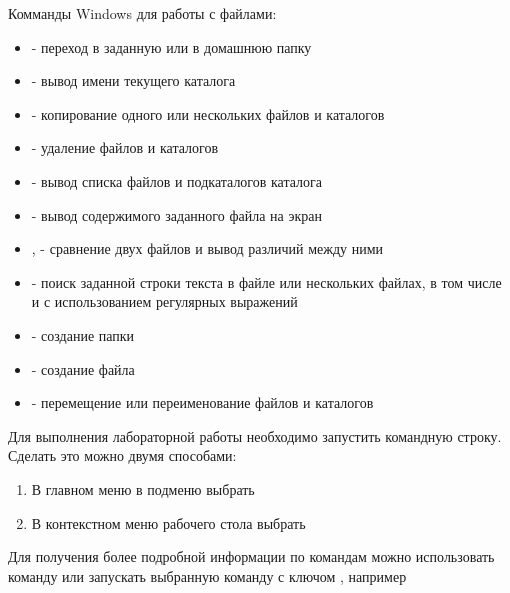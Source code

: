 \documentclass[a4paper,12pt]{article}
\begin{document}
  
    \begin{flushleft}
        Комманды Windows для работы с файлами:
        \begin{itemize}
            \item {} - переход в заданную или в домашнюю папку
            \item {} - вывод имени текущего каталога
            \item {} - копирование одного или нескольких файлов и каталогов
            \item {} - удаление файлов и каталогов
            \item {} - вывод списка файлов и подкаталогов каталога
            \item {} - вывод содержимого заданного файла на экран
            \item {},  - сравнение двух файлов и вывод различий между ними
            \item {} - поиск заданной строки текста в файле или нескольких файлах, в том числе и с использованием регулярных выражений
            \item {} - создание папки
            \item {} - создание файла
            \item {} - перемещение или переименование файлов и каталогов
        \end{itemize}
    \end{flushleft}
  
    \begin{flushleft}
        Для выполнения лабораторной работы необходимо запустить командную строку. Сделать это можно двумя способами:
        \begin{enumerate}
            \item В главном меню в подменю  выбрать 
            \item В контекстном меню рабочего стола выбрать 
        \end{enumerate}
    \end{flushleft}
  
    \begin{flushleft}
        Для получения более подробной информации по командам можно использовать команду  или запускать выбранную команду с ключом , например 
    \end{flushleft}
  
\end{document}
